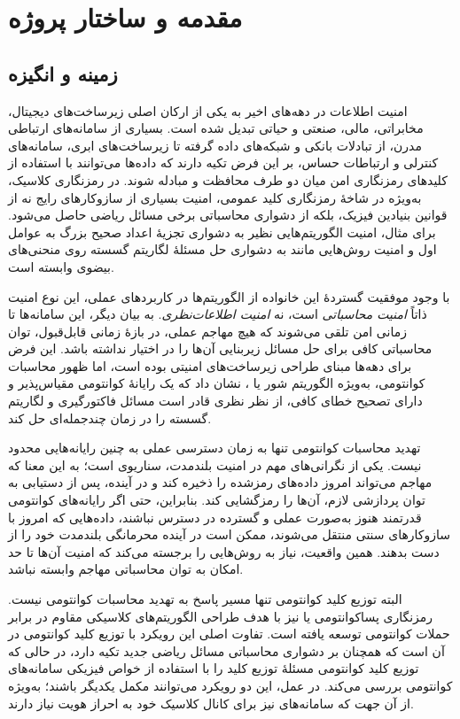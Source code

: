 \chapter{مقدمه و ساختار پروژه}
\label{ch:intro}

\section{زمینه و انگیزه}

امنیت اطلاعات در دهه‌های اخیر به یکی از ارکان اصلی زیرساخت‌های دیجیتال، مخابراتی، مالی، صنعتی و حیاتی تبدیل شده است. بسیاری از سامانه‌های ارتباطی مدرن، از تبادلات بانکی و شبکه‌های داده گرفته تا زیرساخت‌های ابری، سامانه‌های کنترلی و ارتباطات حساس، بر این فرض تکیه دارند که داده‌ها می‌توانند با استفاده از کلیدهای رمزنگاری امن میان دو طرف محافظت و مبادله شوند.
 در رمزنگاری کلاسیک، به‌ویژه در شاخهٔ رمزنگاری کلید عمومی، امنیت بسیاری از سازوکارهای رایج نه از قوانین بنیادین فیزیک، بلکه از دشواری محاسباتی برخی مسائل ریاضی حاصل می‌شود. برای مثال، امنیت الگوریتم‌هایی نظیر  به دشواری تجزیهٔ اعداد صحیح بزرگ به عوامل اول و امنیت روش‌هایی مانند  به دشواری حل مسئلهٔ لگاریتم گسسته روی منحنی‌های بیضوی وابسته است.

با وجود موفقیت گستردهٔ این خانواده از الگوریتم‌ها در کاربردهای عملی، این نوع امنیت ذاتاً \textit{امنیت محاسباتی} است، نه \textit{امنیت اطلاعات‌نظری}. به بیان دیگر، این سامانه‌ها تا زمانی امن تلقی می‌شوند که هیچ مهاجم عملی، در بازهٔ زمانی قابل‌قبول، توان محاسباتی کافی برای حل مسائل زیربنایی آن‌ها را در اختیار نداشته باشد. این فرض برای دهه‌ها مبنای طراحی زیرساخت‌های امنیتی بوده است، اما ظهور محاسبات کوانتومی، به‌ویژه الگوریتم شور یا ، نشان داد که یک رایانهٔ کوانتومی مقیاس‌پذیر و دارای تصحیح خطای کافی، از نظر نظری قادر است مسائل فاکتورگیری و لگاریتم گسسته را در زمان چندجمله‌ای حل کند.

تهدید محاسبات کوانتومی تنها به زمان دسترسی عملی به چنین رایانه‌هایی محدود نیست. یکی از نگرانی‌های مهم در امنیت بلندمدت، سناریوی  است؛ به این معنا که مهاجم می‌تواند امروز داده‌های رمزشده را ذخیره کند و در آینده، پس از دستیابی به توان پردازشی لازم، آن‌ها را رمزگشایی کند. بنابراین، حتی اگر رایانه‌های کوانتومی قدرتمند هنوز به‌صورت عملی و گسترده در دسترس نباشند، داده‌هایی که امروز با سازوکارهای سنتی منتقل می‌شوند، ممکن است در آینده محرمانگی بلندمدت خود را از دست بدهند. همین واقعیت، نیاز به روش‌هایی را برجسته می‌کند که امنیت آن‌ها تا حد امکان به توان محاسباتی مهاجم وابسته نباشد.

البته توزیع کلید کوانتومی تنها مسیر پاسخ به تهدید محاسبات کوانتومی نیست. رمزنگاری پساکوانتومی یا  نیز با هدف طراحی الگوریتم‌های کلاسیکی مقاوم در برابر حملات کوانتومی توسعه یافته است. تفاوت اصلی این رویکرد با توزیع کلید کوانتومی در آن است که  همچنان بر دشواری محاسباتی مسائل ریاضی جدید تکیه دارد، در حالی که توزیع کلید کوانتومی مسئلهٔ توزیع کلید را با استفاده از خواص فیزیکی سامانه‌های کوانتومی بررسی می‌کند. در عمل، این دو رویکرد می‌توانند مکمل یکدیگر باشند؛ به‌ویژه از آن جهت که سامانه‌های  نیز برای کانال کلاسیک خود به احراز هویت نیاز دارند.

